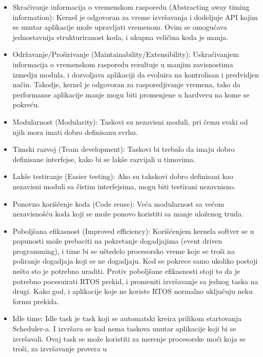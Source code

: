 \documentclass[a4paper,12pt, master]{etf}
\begin{document}
	\begin{itemize}
		\item Skra\'{c}ivanje informacija o vremenskom rasporedu (Abstracting 
		away timing information):
		Kernel je odgovoran za vreme izvr\v{s}avanja i dodeljuje API kojim se
		unutar aplikacije mo\v{z}e upravljati vremenom. Ovim se omogu\'{c}ava 
		jednostavnija strukturiranost koda, i ukupna veli\v{c}ina koda je manja.
		\item Odr\v{z}avanje/Pro\v{s}irivanje (Maintainability/Extensibility):
		Uskra\'{c}ivanjem informacija o vremenskom rasporedu rezultuje u manjim 
		zavisnostima izmedju modula, i dozvoljava aplikaciji da evoluira na 
		kontrolisan i predvidjen na\v{c}in. Takodje, kernel je odgovoran za 
		rasporedjivanje vremena, tako da performanse aplikacije manje mogu biti 
		promenjene u hardveru na kome se pokre\'{c}u.
		\item Modularnost (Modularity):
		Taskovi su nezavisni moduli, pri \v{c}emu svaki od njih mora imati 
		dobro definisanu svrhu.
		\item Timski razvoj (Team development):
		Taskovi bi trebalo da imaju dobro definisane interfejse, kako bi se 
		lak\v{s}e razvijali u timovima.
		\item Lak\v{s}e testiranje (Easier testing):
		Ako su takskovi dobro definisani kao nezavisni moduli sa \v{c}istim 
		interfejsima, mogu biti	testirani nezavnisno.
		\item Ponovno kori\v{s}\'{c}enje koda (Code reuse):
		Ve\'{c}a modularnost sa ve\'{c}om nezavisno\v{s}\'{c}u koda koji se 
		mo\v{z}e ponovo koristiti sa manje ulo\v{z}enog truda.
		\item Pobolj\v{s}ana efikasnost (Improved efficiency):
		Kori\v{s}\'{c}enjem kernela softver se u popunosti mo\v{z}e prebaciti 
		na pokretanje dogadjajima (event driven programming), i time bi se 
		u\v{s}tedelo procesorsko vreme koje se tro\v{s}i na	poliranje dogadjaja 
		koji se ne dogadjaju. Kod se pokrece samo ukoliko postoji ne\v{s}to
		sto je potrebno	uraditi. Protiv pobolj\v{s}ane efikasnosti stoji to da 
		je potrebno pocesuirati	RTOS prekid, i promeniti izvr\v{s}avanje sa 
		jednog taska na drugi. Kako god, i aplikacije koje ne koriste RTOS 
		normalno uklju\v{c}uju neku formu prekida.
		\item Idle time:
		Idle task je task koji se automatski kreira prilikom startovanja 
		Scheduler-a. I izvr\v{s}ava se kad nema taskova unutar aplikacije koji 
		bi se izvr\v{s}avali. Ovaj task se mo\v{z}e koristiti za merenje 
		procesorske mo\'{c}i koja se tro\v{s}i, za izvr\v{s}avanje provera u 

\end{itemize}
\end{document}
